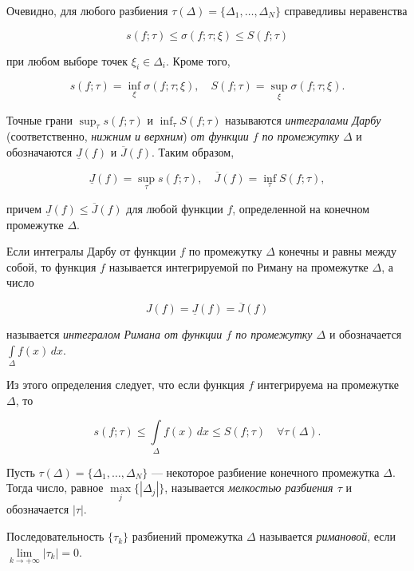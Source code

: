 Очевидно, для любого разбиения $\tau(\Delta) = \{ \Delta_1, \ldots, \Delta_N\}$ справедливы неравенства

$$
s(f; \tau) \le \sigma(f; \tau; \xi) \le S(f; \tau)
$$

при любом выборе точек $\xi_i \in \Delta_i$. Кроме того,

$$
s(f; \tau) = \inf_{\xi} \sigma(f; \tau; \xi), \quad S(f; \tau) = \sup_{\xi} \sigma(f; \tau; \xi).
$$

\begin{defn}
Точные грани $\sup_{\tau} s(f; \tau)$ и $\inf_{\tau} S(f; \tau)$ называются \textit{интегралами Дарбу} (соответственно, \textit{нижним и верхним}) \textit{от функции $f$ по промежутку $\Delta$} и обозначаются $\underline{J}(f)$ и $\overline{J}(f)$. Таким образом,

$$
\underline{J}(f) = \sup_{\tau} s(f; \tau), \quad \overline{J}(f) = \inf_{\tau} S(f; \tau),
$$

причем $\underline{J}(f) \le \overline{J}(f)$ для любой функции $f$, определенной на конечном промежутке 
$\Delta$.
\end{defn}


\begin{defn}
Если интегралы Дарбу от функции $f$ по промежутку $\Delta$ конечны и равны между собой, то функция $f$ называется интегрируемой по Риману на промежутке $\Delta$, а число

$$
J(f) = \underline{J}(f) = \overline{J}(f)
$$

называется \textit{интегралом Римана от функции $f$ по промежутку $\Delta$} и обозначается $\int\limits_{\Delta} f(x) \,dx$.
\end{defn}

Из этого определения следует, что если функция $f$ интегрируема на промежутке $\Delta$, то

$$
s(f; \tau) \le \int\limits_{\Delta} f(x) \,dx \le S(f; \tau) \quad \forall \tau(\Delta).
$$

\begin{defn}
Пусть $\tau(\Delta) = \{ \Delta_1, \ldots, \Delta_N\}$ --- некоторое разбиение конечного промежутка $\Delta$. Тогда число, равное $\max\limits_j \{ |\Delta_j|\}$, называется \textit{мелкостью разбиения $\tau$} и обозначается $|\tau|$.
\end{defn}

\begin{defn}
Последовательность $\{\tau_k\}$ разбиений промежутка $\Delta$ называется \textit{римановой}, если $\lim\limits_{k \to +\infty}|\tau_k|=0$.
\end{defn}

